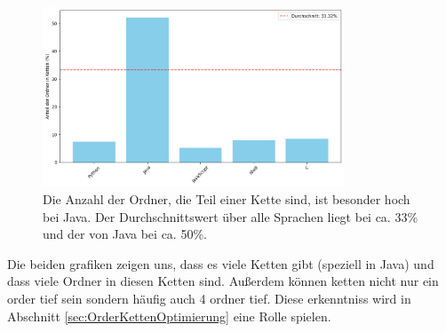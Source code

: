 \begin{figure}
    \centering
    \includegraphics[width=0.8\textwidth]{images/datenanalyse/spracheVsOrderInKetten.png}
    \caption{Die Anzahl der Ordner, die Teil einer Kette sind, ist besonder hoch bei Java. Der Durchschnittswert über alle Sprachen liegt bei ca. 33\% und der von Java bei ca. 50\%.}
    \label{fig:spracheVsOrderInKetten}
\end{figure}
Die beiden grafiken zeigen uns, dass es viele Ketten gibt (speziell in Java) und dass viele Ordner in diesen Ketten sind. Außerdem können ketten nicht nur ein order tief sein sondern häufig auch 4 ordner tief. Diese erkenntniss wird in Abschnitt \ref{sec:OrderKettenOptimierung} eine Rolle spielen.
